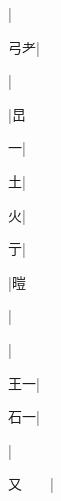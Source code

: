 \begin{multicols}{2}
{{\cjk{}{\cnsym{}　}{\cnsym{}　}{\cnsym{}　}}|{}\par
{\cjk{}{\cnsym{}　}弓耂}|{}\par
{\cjk{}{\cnsym{}　}{\cnsym{}　}{\cnsym{}　}}|{}\par
{\cjk{}{\cnsym{}　}{\cnsym{}　}{\cnsym{}　}}|{\cjk{}旵}\par
{\cjk{}{\cnsym{}　}{\cnsym{}　}一}|{}\par
{\cjk{}{\cnsym{}　}{\cnsym{}　}土}|{}\par
{\cjk{}{\cnsym{}　}{\cnsym{}　}火}|{}\par
{亍}|{}\par
{\cjk{}{\cnsym{}　}{\cnsym{}　}{\cnsym{}　}}|{\cjk{}暟}\par
{\cjk{}{\cnsym{}　}{\cnsym{}　}{\cnsym{}　}}|{}\par
{\cjk{}{\cnsym{}　}{\cnsym{}　}{\cnsym{}　}}|{}\par
{\cjk{}{\cnsym{}　}王一}|{}\par
{\cjk{}{\cnsym{}　}石一}|{}\par
{\cjk{}{\cnsym{}　}{\cnsym{}　}{\cnsym{}　}}|{}\par
{\cjk{}又{\cnsym{}　}{\cnsym{}　}}|{}\par
}
\end{multicols}
